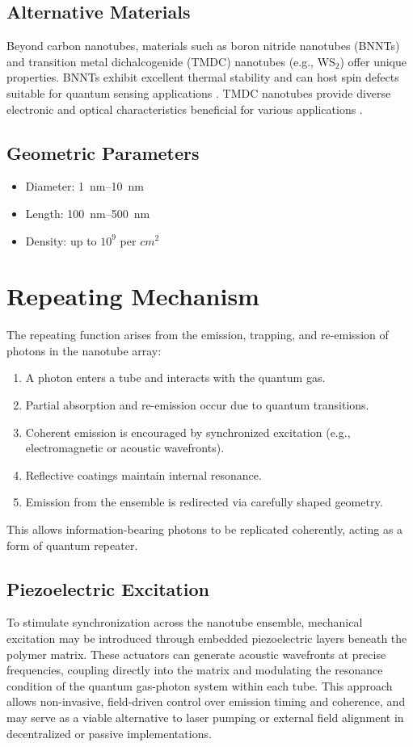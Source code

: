 \documentclass[11pt]{article}
\begin{document}
	\subsection{Alternative Materials}
	Beyond carbon nanotubes, materials such as boron nitride nanotubes (BNNTs) and transition metal dichalcogenide (TMDC) nanotubes (e.g., WS$_2$) offer unique properties. BNNTs exhibit excellent thermal stability and can host spin defects suitable for quantum sensing applications \cite{gao2023nanotube}. TMDC nanotubes provide diverse electronic and optical characteristics beneficial for various applications \cite{yadgarov2020nanotubes}.
	
	\subsection{Geometric Parameters}
	\begin{itemize}
		\item Diameter: \SIrange{1}{10}{\nano\meter}
		\item Length: \SIrange{100}{500}{\nano\meter}
		\item Density: up to $10^9$ per $\si{cm^2}$
	\end{itemize}
	
	\section{Repeating Mechanism}
	The repeating function arises from the emission, trapping, and re-emission of photons in the nanotube array:
	\begin{enumerate}
		\item A photon enters a tube and interacts with the quantum gas.
		\item Partial absorption and re-emission occur due to quantum transitions.
		\item Coherent emission is encouraged by synchronized excitation (e.g., electromagnetic or acoustic wavefronts).
		\item Reflective coatings maintain internal resonance.
		\item Emission from the ensemble is redirected via carefully shaped geometry.
	\end{enumerate}
	This allows information-bearing photons to be replicated coherently, acting as a form of quantum repeater.
	
	\subsection{Piezoelectric Excitation}
	To stimulate synchronization across the nanotube ensemble, mechanical excitation may be introduced through embedded piezoelectric layers beneath the polymer matrix. These actuators can generate acoustic wavefronts at precise frequencies, coupling directly into the matrix and modulating the resonance condition of the quantum gas-photon system within each tube. This approach allows non-invasive, field-driven control over emission timing and coherence, and may serve as a viable alternative to laser pumping or external field alignment in decentralized or passive implementations.
	
\end{document}
